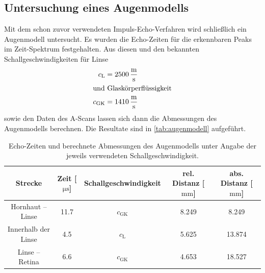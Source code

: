 \FloatBarrier
\subsection{Untersuchung eines Augenmodells}
\label{sec:auswertung:augenmodell}

Mit dem schon zuvor verwendeten Impuls-Echo-Verfahren
wird schließlich ein Augenmodell untersucht.
Es wurden die Echo-Zeiten für die erkennbaren Peaks im Zeit-Spektrum festgehalten.
Aus diesen und den bekannten Schallgeschwindigkeiten
für Linse
\begin{align*}
c_\text{L} &= \SI{2500}{\meter\per\second} \\
\intertext{und Glaskörperflüssigkeit}
c_\text{GK} &= \SI{1410}{\meter\per\second} \\
\end{align*}
sowie den Daten des A-Scans
lassen sich dann die Abmessungen des Augenmodells berechnen.
Die Resultate sind in \autoref{tab:augenmodell} aufgeführt.

\begin{table}
  \centering
  \caption{Echo-Zeiten und berechnete Abmessungen des Augenmodells unter Angabe der jeweils verwendeten Schallgeschwindigkeit.}
  \label{tab:augenmodell}
  \begin{tabular}{c S c S S}
  \toprule
  Strecke &
  {Zeit [$\si{\micro\second}$]} &
  Schallgeschwindigkeit &
  {rel. Distanz [$\si{\milli\meter}$]} &
  {abs. Distanz [$\si{\milli\meter}$]} \\
  \midrule
  Hornhaut – Linse    & 11.7 & $c_\text{GK}$ & 8.249 &  8.249 \\
  Innerhalb der Linse &  4.5 & $c_\text{L}$  & 5.625 & 13.874 \\
  Linse – Retina      &  6.6 & $c_\text{GK}$ & 4.653 & 18.527 \\
  \bottomrule
  \end{tabular}
\end{table}
